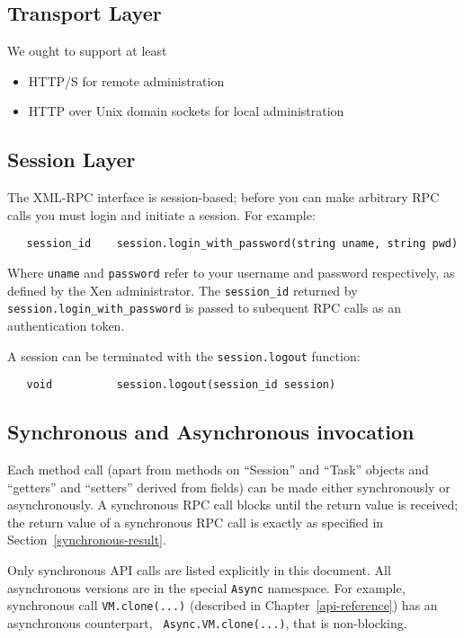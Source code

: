 \subsection{Transport Layer}

We ought to support at least
\begin{itemize}
\item HTTP/S for remote administration
\item HTTP over Unix domain sockets for local administration
\end{itemize}

\subsection{Session Layer}

The XML-RPC interface is session-based; before you can make arbitrary RPC calls
you must login and initiate a session. For example:
\begin{verbatim}
   session_id    session.login_with_password(string uname, string pwd)
\end{verbatim}
Where {\tt uname} and {\tt password} refer to your username and password
respectively, as defined by the Xen administrator.
The {\tt session\_id} returned by {\tt session.login_with_password} is passed
to subequent RPC calls as an authentication token.

A session can be terminated with the {\tt session.logout} function:
\begin{verbatim}
   void          session.logout(session_id session)
\end{verbatim}

\subsection{Synchronous and Asynchronous invocation}

Each method call (apart from methods on ``Session'' and ``Task'' objects 
and ``getters'' and ``setters'' derived from fields)
can be made either synchronously or asynchronously.
A synchronous RPC call blocks until the
return value is received; the return value of a synchronous RPC call is
exactly as specified in Section~\ref{synchronous-result}.

Only synchronous API calls are listed explicitly in this document. 
All asynchronous versions are in the special {\tt Async} namespace.
For example, synchronous call {\tt VM.clone(...)}
(described in Chapter~\ref{api-reference})
has an asynchronous counterpart, {\tt
Async.VM.clone(...)}, that is non-blocking.

